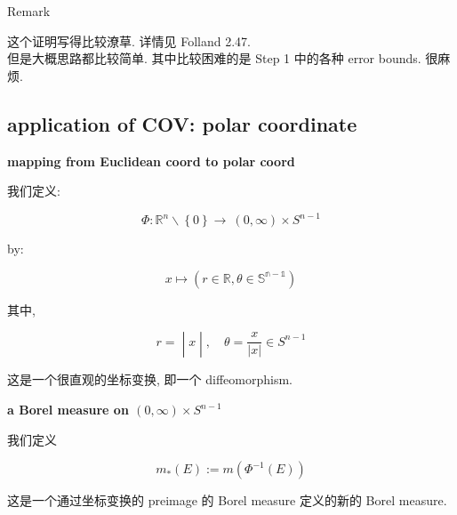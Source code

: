 \documentclass{qlnotes-export}
\begin{document}
\begin{qlremark}{Remark}

这个证明写得比较潦草. 详情见 Folland 2.47.\\
但是大概思路都比较简单. 其中比较困难的是 Step 1 中的各种 error bounds. 很麻烦.\\

\end{qlremark}

\subsection{application of COV: polar coordinate}\label{application-of-cov-polar-coordinate}

\begin{definition}{\protect{}\label{kn-mapping-from-euclidean-coord-to-polar-coord}{\textbf{mapping
from Euclidean coord to polar coord}}}

我们定义:

\[\Phi:{\mathbb{R}}^{n}\backslash\left\{ 0 \right\}\rightarrow\ (0,\infty) \times S^{n - 1}\]

by:

\[x\mapsto(r \in {\mathbb{R}},\theta \in {\mathbb{S}}^{{\mathbb{n}} - \mathbb{1}})\]

其中,

\[\left. r = \middle| x \middle| ,\quad\theta = \frac{x}{|x|} \in S^{n - 1} \right.\]

\end{definition}

这是一个很直观的坐标变换, 即一个 diffeomorphism.\\

\begin{definition}{\protect{}\label{kn-a-borel-measure-on-0-infty-times-s-n-1}{\textbf{a
Borel measure on \((0,\infty) \times S^{n - 1}\)}}}

我们定义

\[m_{\ast}(E) := m(\Phi^{- 1}(E))\]

\end{definition}

这是一个通过坐标变换的 preimage 的 Borel measure 定义的新的 Borel measure.\\
\end{document}
